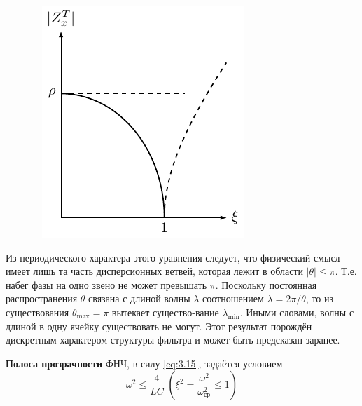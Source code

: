 \begin{figure}[h!] 
	\centering
	\includegraphics[]{chem/FLF/ZxT.pdf}
	\caption{}
	\label{fig:1.2}
\end{figure}
Из периодического характера этого уравнения следует, что физический смысл имеет лишь та часть дисперсионных ветвей, которая лежит в области $|\theta|\leq\pi$. Т.е. набег фазы на одно звено не может превышать $\pi$. Поскольку постоянная распространения $\theta$ связана с длиной волны $\lambda$ соотношением $\lambda=2\pi/\theta$, то из существования $\theta_{\text{max}}=\pi$ вытекает существо-вание $\lambda_{\text{min}}$. Иными словами, волны с длиной в одну ячейку существовать не могут. Этот результат порождён дискретным характером структуры фильтра и может быть предсказан заранее.

\textbf{Полоса прозрачности} ФНЧ, в силу \eqref{eq:3.15}, задаётся условием
\begin{equation}
\label{eq:5.1.3}
\omega^2\leq\frac{4}{LC}\; (\xi^2=\frac{\omega^2}{\omega^2_{\text{ср}}}\leq1)
\end{equation}

